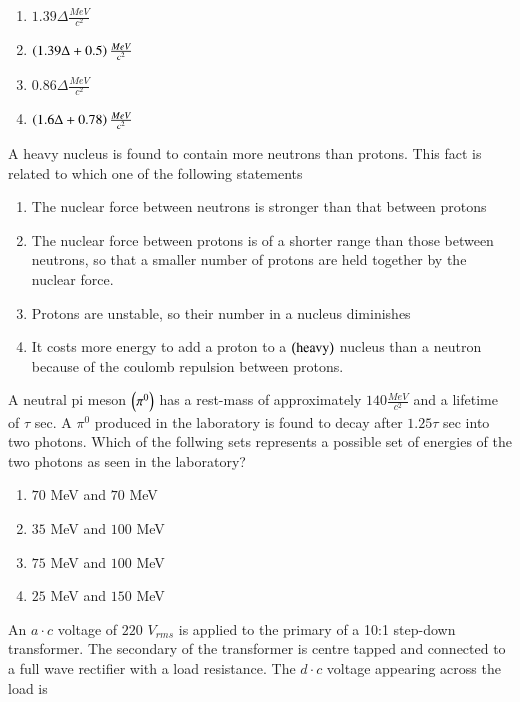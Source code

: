 \documentclass[journal]{IEEEtran}
\begin{document}
\begin{enumerate}
{{\begin{multicols}{2}
\begin{enumerate}
\item $1.39\Delta\frac{MeV}{c^2}$ 
\item $\left(1.39\Delta+0.5\right)\frac{MeV}{c^2}$
\item $0.86\Delta\frac{MeV}{c^2}$ 
\item $\left(1.6\Delta+0.78\right)\frac{MeV}{c^2}$
\end{enumerate}
\end{multicols}
}
\item{
A heavy nucleus is found to contain more neutrons than protons. This fact is related to which one of the following statements
\begin{enumerate}
\item The nuclear force between neutrons is stronger than that between protons
\item The nuclear force between protons is of a shorter range than those between neutrons, so that a smaller number of protons are held together by the nuclear force.
\item Protons are unstable, so their number in a nucleus diminishes
\item It costs more energy to add a proton to a $\left(\text{heavy}\right)$ nucleus than a neutron because of the coulomb repulsion between protons.
\end{enumerate}
}
\item{
A neutral pi meson $\left(\pi^0\right)$ has a rest-mass of approximately $140\frac{MeV}{c^2}$ and a lifetime of $\tau$ sec. A $\pi^0$ produced in the laboratory is found to decay after $1.25\tau$ sec into two photons. Which of the follwing sets represents a possible set of energies of the two photons as seen in the laboratory?
\begin{multicols}{2}
\begin{enumerate}
\item $70$ MeV and $70$ MeV
\item $35$ MeV and $100$ MeV
\item $75$ MeV and $100$ MeV  
\item $25$ MeV and $150$ MeV
\end{enumerate}
\end{multicols}
}
\item{
An $a\cdot c$ voltage of $220$ $V_{rms}$ is applied to the primary of a 10:1 step-down transformer. The secondary of the transformer is centre tapped and connected to a full wave rectifier with a load resistance. The $d\cdot c$ voltage appearing across the load is 
}}
\end{enumerate}
\end{document}
